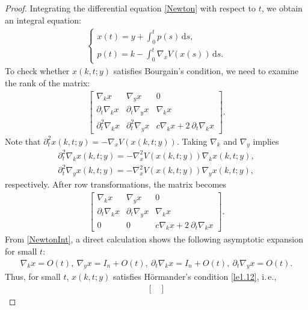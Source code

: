 \documentclass{article}
\numberwithin{equation}{section}
\theoremstyle{plain}
\begin{document}
    \begin{proof}
        Integrating the differential equation \eqref{Newton} with respect to $t$, we obtain an integral equation:
	\begin{align}\label{NewtonInt}
		\begin{cases}
			x(t)= y+ \int_0^t p(s)\,\text{d}s, \\
			p(t)= k- \int_0^t \nabla_x V(x(s)) \,\text{d}s.
		\end{cases}
	\end{align}
	   To check whether $x(k,t;y)$ satisfies Bourgain's condition,  we need to examine the rank of the matrix:
	\begin{align}
		\begin{bmatrix}
			\nabla_k x & \nabla_y x  & 0  \\
			\partial_t\nabla_k x & \partial_t\nabla_y x & \nabla_k x  \\
			\partial_t^2\nabla_k x & \partial_t^2\nabla_y x  
			& c \nabla_k x+ 2\ \partial_t\nabla_k x 
		\end{bmatrix}.
	\end{align}
	Note that $\partial_t^2 x(k,t;y)= -\nabla_x V(x(k,t;y))$. Taking $\nabla_k$ and $\nabla_y$ implies 
	\begin{align}
		\partial^2_t\nabla_k x(k,t;y)= -\nabla^2_x V(x(k,t;y))\nabla_k x(k,t;y), \label{251210eC-14}\\	
		\partial^2_t\nabla_y x(k,t;y)= -\nabla^2_x V(x(k,t;y))\nabla_y x(k,t;y),
	\end{align}
	respectively. After row transformations, the matrix becomes
	\begin{align}
		\begin{bmatrix}
			\nabla_k x & \nabla_y x  & 0  \\
			\partial_t\nabla_k x & \partial_t\nabla_y x & \nabla_k x  \\
			0 & 0  
			& c \nabla_k x+ 2\ \partial_t\nabla_k x 
		\end{bmatrix}.
	\end{align}
	From \eqref{NewtonInt}, a direct calculation shows the following asymptotic expansion for small $t$:
	\begin{align}
		\nabla_k x=O(t),\ \nabla_y x= I_n+O(t),\ \partial_t\nabla_k x= I_n+ O(t),\ \partial_t\nabla_y x= O(t).
	\end{align}
	Thus, for small $t$, $x(k,t;y)$ satisfies H\"ormander's condition \eqref{le1.12}, i.\,e., 
	\begin{align}
		\begin{bmatrix}

\end{bmatrix}
\end{align}
\end{proof}
\end{document}
